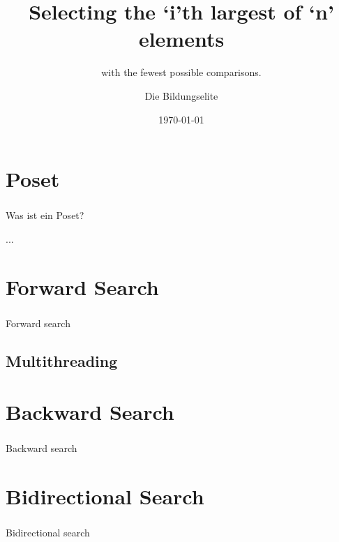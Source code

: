 \documentclass{beamer}
\title{Selecting the `i'th largest of `n' elements}
\subtitle{with the fewest possible comparisons.}
\author{Die Bildungselite}
\date{\today}
\begin{document}
\begin{frame}
    \titlepage
\end{frame}

\section{Poset}

\begin{frame}
    \frametitle{\insertsection}

    Was ist ein Poset?

    ...

\end{frame}

\section{Forward Search}

\begin{frame}
    \frametitle{\insertsection}

    Forward search

\end{frame}

\subsection{Multithreading}

\begin{frame}
    \frametitle{\insertsubsection}



\end{frame}

\section{Backward Search}

\begin{frame}
    \frametitle{\insertsection}

    Backward search

\end{frame}

\section{Bidirectional Search}

\begin{frame}
    \frametitle{\insertsection}

    Bidirectional search

\end{frame}
\end{document}
